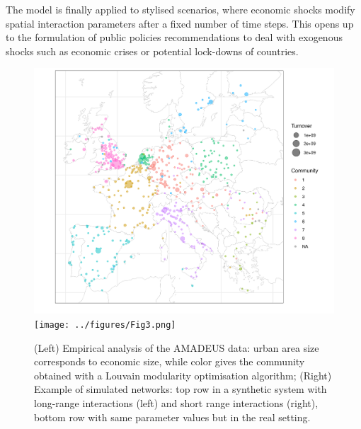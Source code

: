 \documentclass[10pt]{article}
\begin{document}
The model is finally applied to stylised scenarios, where economic shocks modify spatial interaction parameters after a fixed number of time steps. This opens up to the formulation of public policies recommendations to deal with exogenous shocks such as economic crises or potential lock-downs of countries.


\begin{figure}[h!]
    \centering
    \vspace{-0.2cm}
    \includegraphics[width=0.45\linewidth]{../figures/Fig2.png}
    \texttt{[image: ../figures/Fig3.png]}
    \caption{(Left) Empirical analysis of the AMADEUS data: urban area size corresponds to economic size, while color gives the community obtained with a Louvain modularity optimisation algorithm; (Right) Example of simulated networks: top row in a synthetic system with long-range interactions (left) and short range interactions (right), bottom row with same parameter values but in the real setting.}
\end{figure}
\end{document}
